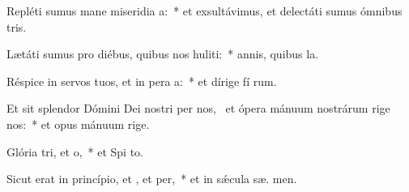 \item Repléti sumus mane miseridia a:~* et exsultávimus, et delectáti sumus ómnibus  tris.
\item Lætáti sumus pro diébus, quibus nos huliti:~* annis, quibus  la.
\item Réspice in servos tuos, et in pera a:~* et dírige fí rum.
\item Et sit splendor Dómini Dei nostri per nos,~\pscross{} et ópera mánuum nostrárum rige  nos:~* et opus mánuum  rige.
\item Glória tri, et o,~* et Spi to.
\item Sicut erat in princípio, et , et per,~* et in sǽcula sæ. men.

